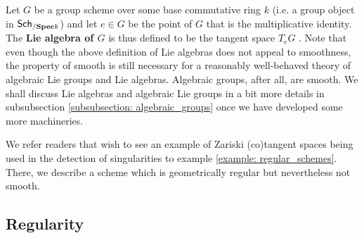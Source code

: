             \begin{example}
                Let $G$ be a group scheme over some base commutative ring $k$ (i.e. a group object in $\mathsf{Sch}_{/\mathbf{Spec} k}$) and let $e \in G$ be the point of $G$ that is the multiplicative identity. The \textbf{Lie algebra of $G$} is thus defined to be the tangent space $T_eG$ . Note that even though the above definition of Lie algebras does not appeal to smoothness, the property of smooth is still necessary for a reasonably well-behaved theory of algebraic Lie groups and Lie algebras. Algebraic groups, after all, are smooth. We shall discuss Lie algebras and algebraic Lie groups in a bit more details in subsubsection \ref{subsubsection: algebraic_groups} once we have developed some more machineries.
            \end{example}
            
            We refer readers that wish to see an example of Zariski (co)tangent spaces being used in the detection of singularities to example \ref{example: regular_schemes}. There, we describe a scheme which is geometrically regular but nevertheless not smooth.
            
        \subsection{Regularity}
